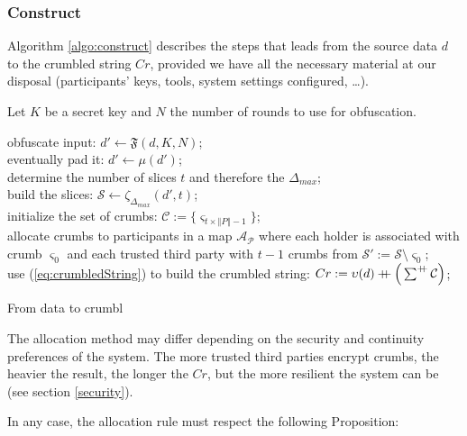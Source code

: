 \documentclass[twoside,twocolumn]{article}
\newcommand{\concat}{\mathbin{{+}\mspace{-8mu}{+}}}
\newcommand{\norm}[1]{\left\Vert#1\right\Vert}
\theoremstyle{definition}
\theoremstyle{remark}
\begin{document}
\subsubsection{Construct}

Algorithm \ref{algo:construct} describes the steps that leads from the source data $d$ to the crumbled string $Cr$, provided we have all the necessary 
material at our disposal (participants' keys, tools, system settings configured, \dots).

Let $K$ be a secret key and $N$ the number of rounds to use for obfuscation.
\begin{algorithm}
    obfuscate input: $d' \gets \mathfrak{F}(d, K, N)$; \\
    eventually pad it: $d' \gets \mu(d')$; \\
    determine the number of slices $t$ and therefore the $\Delta_{max}$; \\
    build the slices: $\mathcal{S} \gets \zeta_{\Delta_{max}}(d', t)$; \\
    initialize the set of crumbs: $\mathcal{C} := \{ \varsigma_{t \times \norm{P} - 1} \}$; \\
    allocate crumbs to participants in a map $\mathcal{A_P}$ where each holder is associated with crumb $\varsigma_0$ and each trusted third party with 
    $t - 1$ crumbs from $\mathcal{S}' := \mathcal{S} \setminus \varsigma_0$; \\
    \For{$i \gets 0$ \KwTo $t-1$ \KwBy $1$}{
        \For{$j \gets 0$ \KwTo $\norm{A_P}-1$ \KwBy $1$}{
            $\mathcal{C} \gets \mathfrak{c}(\sigma_i \in \mathcal{S}, \pi_j^{PK} \in P)$;
        }
    }
    use (\ref{eq:crumbledString}) to build the crumbled string: $Cr := \upsilon(d) \concat \Big( \sum^{\concat} \mathcal{C} \Big)$; \\
    \caption{From data to crumbl}
    \label{algo:construct}
\end{algorithm}

The allocation method may differ depending on the security and continuity preferences of the system.
The more trusted third parties encrypt crumbs, the heavier the result, the longer the $Cr$, but the more resilient the system can be (see section 
\ref{security}).

In any case, the allocation rule must respect the following Proposition:
\end{document}
